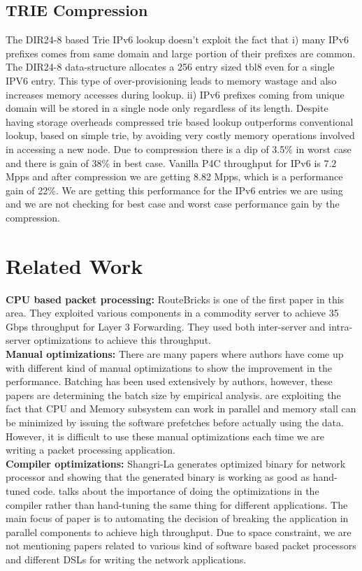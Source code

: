 \subsection{TRIE Compression}
The DIR24-8\cite{Gupta98routinglookups} based Trie IPv6 lookup doesn't exploit the fact that i) many IPv6 prefixes comes from same domain and large portion of their prefixes are common. The DIR24-8 data-structure allocates a 256 entry sized tbl8 even for a single IPV6 entry. This type of over-provisioning leads to memory wastage and also increases memory accesses during lookup. ii) IPv6 prefixes coming from unique domain will be stored in a single node only regardless of its length. Despite having storage overheads compressed trie based lookup outperforms conventional lookup, based on simple trie, by avoiding very costly memory operations involved in accessing a new node. Due to compression there is a dip of 3.5\% in worst case and there is gain of 38\% in best case. Vanilla P4C throughput for IPv6 is 7.2 Mpps and after compression we are getting 8.82 Mpps, which is a performance gain of 22\%. We are getting this performance for the IPv6 entries we are using and we are not checking for best case and worst case performance gain by the compression.

\section{Related Work}
\label{relatedwork}
\textbf{CPU based packet processing:} RouteBricks\cite{dobrescu2009routebricks} is one of the first paper in this area. They exploited various components in a commodity server to achieve 35 Gbps throughput for Layer 3 Forwarding. They used both inter-server and intra-server optimizations to achieve this throughput.
\\
\textbf{Manual optimizations:} There are many papers where authors have come up with different kind of manual optimizations to show the improvement in the performance. Batching\cite{dobrescu2009routebricks, 189006, Kim:2012:PBC:2349896.2349910, Zhou:2013:SHP:2535372.2535379} has been used extensively by authors, however, these papers are determining the batch size by empirical analysis. \cite{189006, Zhou:2013:SHP:2535372.2535379} are exploiting the fact that CPU and Memory subsystem can work in parallel and memory stall can be minimized by issuing the software prefetches before actually using the data. However, it is difficult to use these manual optimizations each time we are writing a packet processing application.
\\
\textbf{Compiler optimizations:} Shangri-La \cite{Chen:2005:SAH:1065010.1065038} generates optimized binary for network processor and showing that the generated binary is working as good as hand-tuned code. \cite{Dobrescu:2010:CPM:1921151.1921154} talks about the importance of doing the optimizations in the compiler rather than hand-tuning the same thing for different applications. The main focus of paper \cite{Dobrescu:2010:CPM:1921151.1921154} is to automating the decision of breaking the application in parallel components to achieve high throughput.
Due to space constraint, we are not mentioning papers related to various kind of software based packet processors and different DSLs for writing the network applications.

